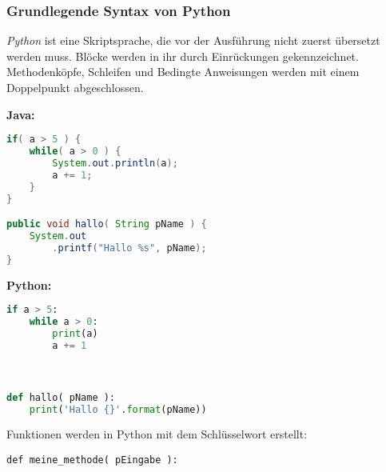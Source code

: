 \documentclass[9pt, a4paper]{arbeitsblatt}
\begin{document}
\ReiheTitel

\begin{infobox}
	\vspace*{-1em}
	\subsubsection*{Grundlegende Syntax von Python}
	\vspace*{-1em}
	\emph{Python} ist eine Skriptsprache, die vor der Ausführung nicht zuerst übersetzt werden muss. Blöcke werden in ihr durch Einrückungen gekennzeichnet. Methodenköpfe, Schleifen und Bedingte Anweisungen werden mit einem Doppelpunkt abgeschlossen.

	\medskip
	\begin{minipage}{.5\textwidth}
\textbf{Java:}

\begin{lstlisting}[language=Java,numbers=none,tabsize=2]
if( a > 5 ) {
	while( a > 0 ) {
		System.out.println(a);
		a += 1;
	}
}

public void hallo( String pName ) {
	System.out
		.printf("Hallo %s", pName);
}
\end{lstlisting}
	\end{minipage}\hfill\begin{minipage}{.45\textwidth}
\textbf{Python:}

\begin{lstlisting}[language=Python,numbers=none,tabsize=2,showlines=true]
if a > 5:
	while a > 0:
		print(a)
		a += 1



def hallo( pName ):
	print('Hallo {}'.format(pName))


\end{lstlisting}
	\end{minipage}

	Funktionen werden in Python mit dem  Schlüsselwort erstellt:

	\verb|def meine_methode( pEingabe ):|

	\vspace*{-1em}

\end{infobox}
\end{document}
